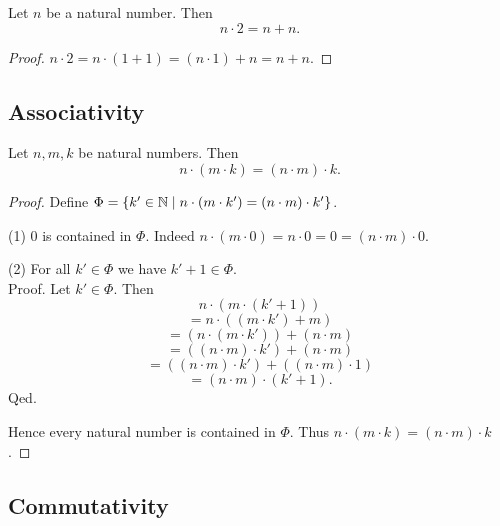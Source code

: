 \documentclass[../arithmetic.tex]{subfiles}
\begin{document}
  \begin{forthel}
    \begin{corollary}
      Let $n$ be a natural number.
      Then \[ n \cdot 2 = n \plus n. \]
    \end{corollary}
    \begin{proof}
      $n \cdot 2
        = n \cdot (1 \plus 1)
        = (n \cdot 1) \plus n
        = n \plus n$.
    \end{proof}
  \end{forthel}


  \subsection*{Associativity}

  \begin{forthel}
    \begin{proposition}
      Let $n, m, k$ be natural numbers.
      Then \[ n \cdot (m \cdot k) = (n \cdot m) \cdot k. \]
    \end{proposition}
    \begin{proof}
      Define $\Phi = \{ k' \in \mathbb{N} \mid n \cdot (m \cdot k') =
      (n \cdot m) \cdot k' \}$.

      (1) $0$ is contained in $\Phi$.
      Indeed $n \cdot (m \cdot 0)
        = n \cdot 0
        = 0
        = (n \cdot m) \cdot 0$.

      (2) For all $k' \in \Phi$ we have $k' \plus 1 \in \Phi$. \\
      Proof.
        Let $k' \in \Phi$.
        Then
        \[  n \cdot (m \cdot (k' \plus 1))                          \]
        \[    = n \cdot ((m \cdot k') \plus m)                      \]
        \[    = (n \cdot (m \cdot k')) \plus (n \cdot m)            \]
        \[    = ((n \cdot m) \cdot k') \plus (n \cdot m)            \]
        \[    = ((n \cdot m) \cdot k') \plus ((n \cdot m) \cdot 1)  \]
        \[    = (n \cdot m) \cdot (k' \plus 1).                     \]
      Qed.

      Hence every natural number is contained in $\Phi$.
      Thus $n \cdot (m \cdot k) = (n \cdot m) \cdot k$.
    \end{proof}
  \end{forthel}


  \subsection*{Commutativity}
\end{document}
